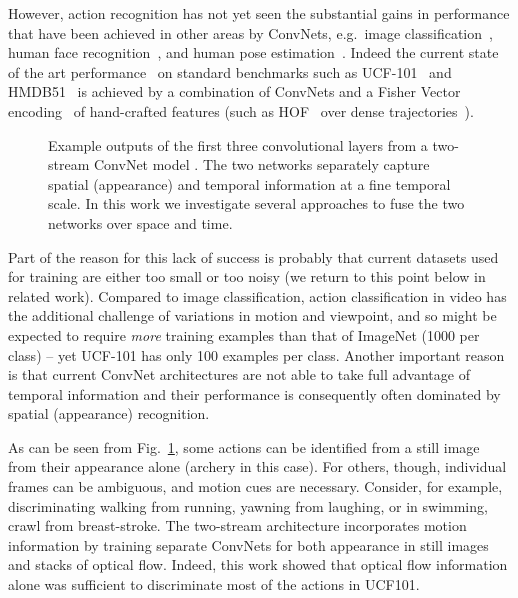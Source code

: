 \documentclass[10pt,twocolumn,letterpaper]{article}
\begin{document}
However, action recognition has not yet seen the substantial gains in
performance that have been achieved in other areas by ConvNets, e.g.\
image classification~\cite{Krizhevsky12,simonyan2014very,szegedy2014going}, 
human face recognition~\cite{Schroff15},
and human pose estimation~\cite{tompson2014efficient}. Indeed
the current state of the art performance~\cite{C3DICCV2015,wang2015action} on
standard benchmarks such as UCF-101~\cite{UCF101} and
HMDB51~\cite{kuehne2011hmdb} is achieved by a combination of ConvNets
and a Fisher Vector
encoding~\cite{Perronnin10a} of 
hand-crafted features (such as HOF~\cite{Laptev08} over dense
trajectories~\cite{wangICCV13}).


\begin{figure}[!t]
	\centering
	\vspace{-5pt}
	\caption{Example outputs of the first three convolutional layers from a two-stream ConvNet model \cite{Simonyan14b}. The two networks separately capture spatial (appearance) and temporal information at a fine temporal scale. In this work we investigate several approaches to fuse the two networks over space and time. 
	}
	\vspace{-15pt}
	\label{fig:teaser}
\end{figure}

Part of the reason for this lack of success is probably that current
datasets used for training 
are either too small or too noisy 
(we return to this point below in related work).
Compared to image classification, action classification in video
has the additional challenge of variations in motion and viewpoint, and
so might be expected to require {\em more} training examples than that
of ImageNet (1000 per class) -- yet UCF-101 has only 100 examples per
class.
Another important reason is that current ConvNet
architectures are not able to take full advantage of temporal
information and their performance is consequently 
often dominated by spatial (appearance) recognition.

As can be seen from Fig.~\ref{fig:teaser}, some actions can be
identified from a still image from their appearance alone (archery in
this case).  For others, though, individual frames can be ambiguous,
and motion cues are necessary. Consider, for example, discriminating
walking from running, yawning from laughing, 
or in swimming, crawl from breast-stroke. 
The two-stream architecture \cite{Simonyan14b}
incorporates motion information by training separate ConvNets for 
both appearance
in still
images and stacks of optical flow. Indeed, this work showed
that optical flow information alone was sufficient to discriminate
most of the actions in UCF101.
\end{document}
